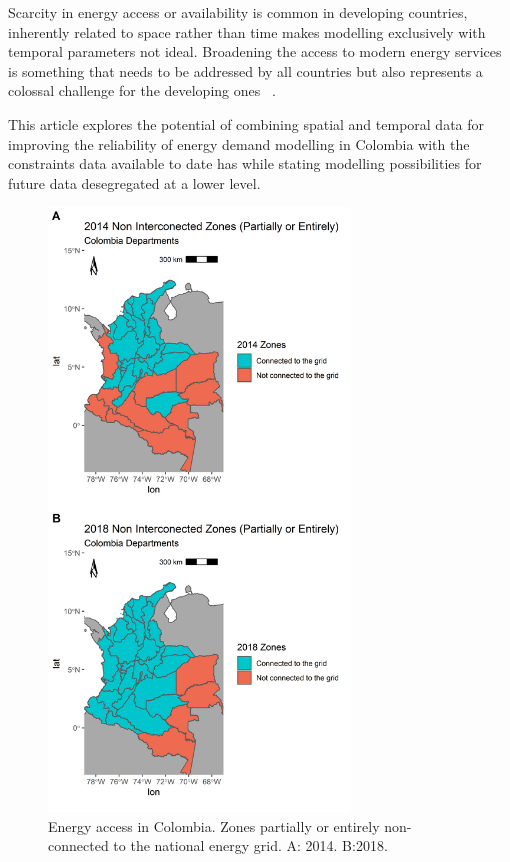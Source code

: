\documentclass[energies,article,accept,pdftex,moreauthors]{Definitions/mdpi}
\begin{document}
Scarcity in energy access or availability is common in developing countries, inherently related to space rather than time makes modelling exclusively with temporal parameters not ideal. Broadening the access to modern energy services is something that needs to be addressed by all countries but also represents a colossal challenge for the developing ones ~\citep{WHO2009TheCountries}. 


This article explores the potential of combining spatial and temporal data for improving the reliability of energy demand modelling in Colombia with the constraints data available to date has while stating modelling possibilities for future data desegregated at a lower level.


      \begin{figure}[H]
   \centering
		\includegraphics[width=8cm]{figs/non_interconnected_zones_v2.png}
	\caption{Energy access in Colombia. Zones partially or entirely non-connected to the national energy grid. A: 2014. B:2018. %
	\label{fig:1}}
    \end{figure}
    
\end{document}
